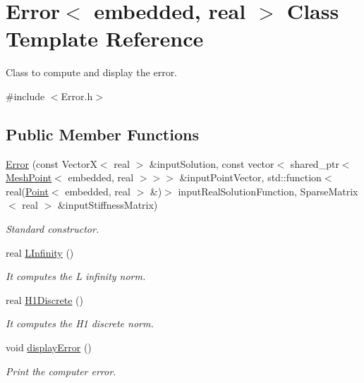 \hypertarget{class_error}{}\section{Error$<$ embedded, real $>$ Class Template Reference}
\label{class_error}


Class to compute and display the error.  




{\ttfamily \#include $<$Error.\+h$>$}

\subsection*{Public Member Functions}
\begin{DoxyCompactItemize}
\item 
\hyperlink{class_error_aefce6e56298750a38873378411ff3d55}{Error} (const VectorX$<$ real $>$ \&input\+Solution, const vector$<$ shared\+\_\+ptr$<$ \hyperlink{class_mesh_point}{Mesh\+Point}$<$ embedded, real $>$$>$$>$ \&input\+Point\+Vector, std\+::function$<$ real(\hyperlink{class_point}{Point}$<$ embedded, real $>$ \&)$>$ input\+Real\+Solution\+Function, Sparse\+Matrix$<$ real $>$ \&input\+Stiffness\+Matrix)
\begin{DoxyCompactList}\small\item\em Standard constructor. \end{DoxyCompactList}\item 
real \hyperlink{class_error_a7a04e88a927c4e4c701e7f482cb97c59}{L\+Infinity} ()\hypertarget{class_error_a7a04e88a927c4e4c701e7f482cb97c59}{}\label{class_error_a7a04e88a927c4e4c701e7f482cb97c59}

\begin{DoxyCompactList}\small\item\em It computes the L infinity norm. \end{DoxyCompactList}\item 
real \hyperlink{class_error_a3e3b35dcf91c1e27cee2fb546d2b9f7d}{H1\+Discrete} ()\hypertarget{class_error_a3e3b35dcf91c1e27cee2fb546d2b9f7d}{}\label{class_error_a3e3b35dcf91c1e27cee2fb546d2b9f7d}

\begin{DoxyCompactList}\small\item\em It computes the H1 discrete norm. \end{DoxyCompactList}\item 
void \hyperlink{class_error_a59f271538fe208ba18e7ed31d0513e83}{display\+Error} ()\hypertarget{class_error_a59f271538fe208ba18e7ed31d0513e83}{}\label{class_error_a59f271538fe208ba18e7ed31d0513e83}

\begin{DoxyCompactList}\small\item\em Print the computer error. \end{DoxyCompactList}\end{DoxyCompactItemize}
